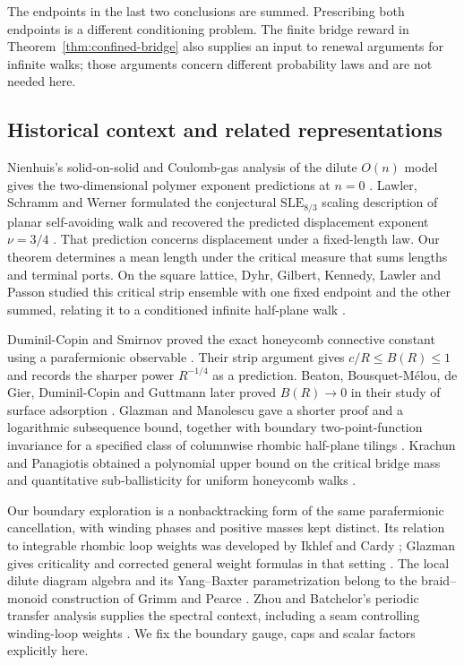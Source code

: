 The endpoints in the last two conclusions are summed.  Prescribing both
endpoints is a different conditioning problem.  The finite bridge reward
in Theorem~\ref{thm:confined-bridge} also supplies an input to renewal
arguments for infinite walks; those arguments concern different probability
laws and are not needed here.

\subsection{Historical context and related representations}
Nienhuis's solid-on-solid and Coulomb-gas analysis of the dilute $O(n)$
model gives the two-dimensional polymer exponent predictions at $n=0$
\cite{Nienhuis1982}. Lawler, Schramm and Werner formulated the conjectural
$\mathrm{SLE}_{8/3}$ scaling description of planar self-avoiding walk and
recovered the predicted displacement exponent $\nu=3/4$
\cite{LawlerSchrammWerner2004}. That prediction concerns
displacement under a fixed-length law. Our theorem determines a
mean length under the critical measure that sums lengths and terminal ports.
On the square lattice, Dyhr, Gilbert, Kennedy, Lawler and Passon studied
this critical strip ensemble with one fixed endpoint and the other summed,
relating it to a conditioned infinite half-plane walk \cite{DyhrEtAl2011}.

Duminil-Copin and Smirnov proved the exact honeycomb connective constant
using a para\-fermionic observable \cite{DuminilCopinSmirnov2012}.
Their strip argument gives $c/R\le B(R)\le1$ and records the sharper
power $R^{-1/4}$ as a prediction.
Beaton, Bousquet-M\'elou, de Gier, Duminil-Copin and Guttmann later proved
$B(R)\to0$ in their study of surface adsorption \cite{BeatonEtAl2014}.
Glazman and Manolescu gave a shorter proof and a logarithmic subsequence
bound, together with boundary two-point-function invariance for a
specified class of columnwise rhombic half-plane tilings
\cite{GlazmanManolescu2017}. Krachun and Panagiotis obtained a polynomial
upper bound on the critical bridge mass and quantitative sub-ballisticity
for uniform honeycomb walks \cite{KrachunPanagiotis2026}.

Our boundary exploration is a nonbacktracking form of the same
parafermionic cancellation, with winding phases and positive masses
kept distinct. Its relation to integrable rhombic loop weights was
developed by Ikhlef and Cardy \cite{IkhlefCardy2009}; Glazman gives
criticality and corrected general weight formulas in that setting
\cite{Glazman2015}. The local dilute diagram algebra and its
Yang--Baxter parametrization belong to the braid--monoid construction
of Grimm and Pearce \cite{GrimmPearce1993}. Zhou and Batchelor's
periodic transfer analysis supplies the spectral context, including a
seam controlling winding-loop weights \cite{ZhouBatchelor1997}.
We fix the boundary gauge, caps and scalar factors explicitly here.


